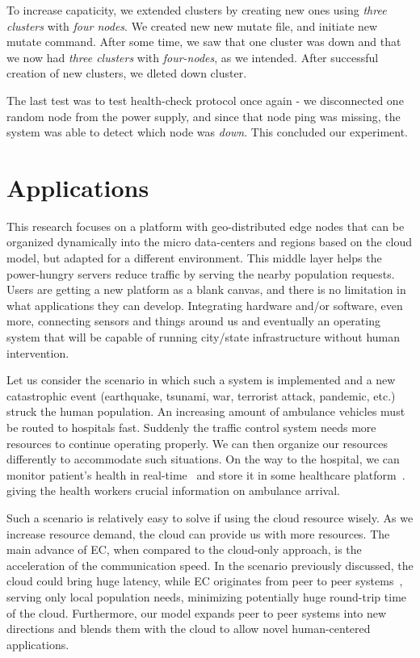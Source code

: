 To increase capaticity, we extended clusters by creating new ones using \emph{three clusters} with \emph{four nodes}. We created new new mutate file, and initiate new mutate command. After some time, we saw that one cluster was down and that we now had \emph{three clusters} with \emph{four-nodes}, as we intended. After successful creation of new clusters, we dleted down cluster.

The last test was to test health-check protocol once again - we disconnected one random node from the power supply, and since that node ping was missing, the system was able to detect which node was \emph{down}. This concluded our experiment.
%
%
\section{Applications}\label{sec:app}
%
This research focuses on a platform with geo-distributed edge nodes that can be organized dynamically into the micro data-centers and regions based on the cloud model, but adapted for a different environment. This middle layer helps the power-hungry servers reduce traffic by serving the nearby population requests. Users are getting a new platform as a blank canvas, and there is no limitation in what applications they can develop. Integrating hardware and/or software, even more, connecting sensors and things around us and eventually an operating system that will be capable of running city/state infrastructure without human intervention.

Let us consider the scenario in which such a system is implemented and a new catastrophic event (earthquake, tsunami, war, terrorist attack, pandemic, etc.) struck the human population. An increasing amount of ambulance vehicles must be routed to hospitals fast. Suddenly the traffic control system needs more resources to continue operating properly. We can then organize our resources differently to accommodate such situations. On the way to the hospital, we can monitor patient's health in real-time~\cite{Al-KhafajiyBCAK19} and store it in some healthcare platform~\cite{OmarBBKR19, inproceedingsSimic5}. giving the health workers crucial information on ambulance arrival. 

Such a scenario is relatively easy to solve if using the cloud resource wisely. As we increase resource demand, the cloud can provide us with more resources. The main advance of EC, when compared to the cloud-only approach, is the acceleration of the communication speed. In the scenario previously discussed, the cloud could bring huge latency, while EC originates from peer to peer systems~\cite{LopezMEDHIBFR15}, serving only local population needs, minimizing potentially huge round-trip time of the cloud. Furthermore, our model expands peer to peer systems into new directions and blends them with the cloud to allow novel human-centered applications. 

